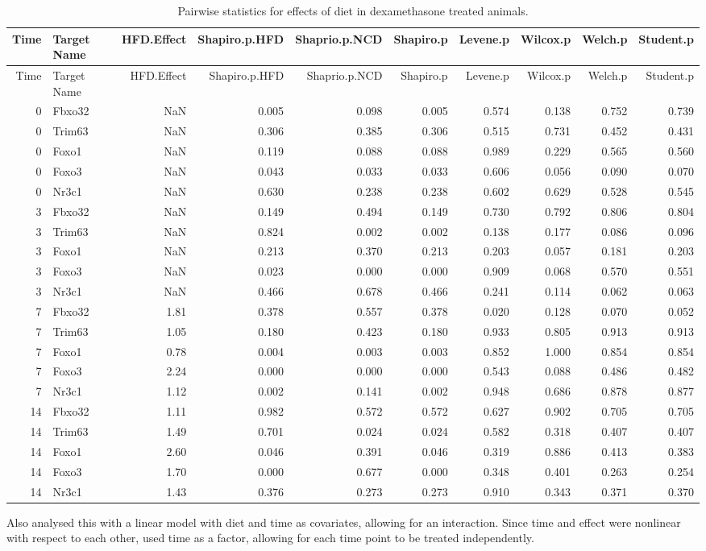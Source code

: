 \documentclass[]{article}
\begin{document}
\begin{longtable}[]{@{}rlrrrrrrrr@{}}
\caption{Pairwise statistics for effects of diet in dexamethasone
treated animals.}\tabularnewline
\toprule
Time & Target Name & HFD.Effect & Shapiro.p.HFD & Shaprio.p.NCD &
Shapiro.p & Levene.p & Wilcox.p & Welch.p & Student.p\tabularnewline
\midrule
\endfirsthead
\toprule
Time & Target Name & HFD.Effect & Shapiro.p.HFD & Shaprio.p.NCD &
Shapiro.p & Levene.p & Wilcox.p & Welch.p & Student.p\tabularnewline
\midrule
\endhead
0 & Fbxo32 & NaN & 0.005 & 0.098 & 0.005 & 0.574 & 0.138 & 0.752 &
0.739\tabularnewline
0 & Trim63 & NaN & 0.306 & 0.385 & 0.306 & 0.515 & 0.731 & 0.452 &
0.431\tabularnewline
0 & Foxo1 & NaN & 0.119 & 0.088 & 0.088 & 0.989 & 0.229 & 0.565 &
0.560\tabularnewline
0 & Foxo3 & NaN & 0.043 & 0.033 & 0.033 & 0.606 & 0.056 & 0.090 &
0.070\tabularnewline
0 & Nr3c1 & NaN & 0.630 & 0.238 & 0.238 & 0.602 & 0.629 & 0.528 &
0.545\tabularnewline
3 & Fbxo32 & NaN & 0.149 & 0.494 & 0.149 & 0.730 & 0.792 & 0.806 &
0.804\tabularnewline
3 & Trim63 & NaN & 0.824 & 0.002 & 0.002 & 0.138 & 0.177 & 0.086 &
0.096\tabularnewline
3 & Foxo1 & NaN & 0.213 & 0.370 & 0.213 & 0.203 & 0.057 & 0.181 &
0.203\tabularnewline
3 & Foxo3 & NaN & 0.023 & 0.000 & 0.000 & 0.909 & 0.068 & 0.570 &
0.551\tabularnewline
3 & Nr3c1 & NaN & 0.466 & 0.678 & 0.466 & 0.241 & 0.114 & 0.062 &
0.063\tabularnewline
7 & Fbxo32 & 1.81 & 0.378 & 0.557 & 0.378 & 0.020 & 0.128 & 0.070 &
0.052\tabularnewline
7 & Trim63 & 1.05 & 0.180 & 0.423 & 0.180 & 0.933 & 0.805 & 0.913 &
0.913\tabularnewline
7 & Foxo1 & 0.78 & 0.004 & 0.003 & 0.003 & 0.852 & 1.000 & 0.854 &
0.854\tabularnewline
7 & Foxo3 & 2.24 & 0.000 & 0.000 & 0.000 & 0.543 & 0.088 & 0.486 &
0.482\tabularnewline
7 & Nr3c1 & 1.12 & 0.002 & 0.141 & 0.002 & 0.948 & 0.686 & 0.878 &
0.877\tabularnewline
14 & Fbxo32 & 1.11 & 0.982 & 0.572 & 0.572 & 0.627 & 0.902 & 0.705 &
0.705\tabularnewline
14 & Trim63 & 1.49 & 0.701 & 0.024 & 0.024 & 0.582 & 0.318 & 0.407 &
0.407\tabularnewline
14 & Foxo1 & 2.60 & 0.046 & 0.391 & 0.046 & 0.319 & 0.886 & 0.413 &
0.383\tabularnewline
14 & Foxo3 & 1.70 & 0.000 & 0.677 & 0.000 & 0.348 & 0.401 & 0.263 &
0.254\tabularnewline
14 & Nr3c1 & 1.43 & 0.376 & 0.273 & 0.273 & 0.910 & 0.343 & 0.371 &
0.370\tabularnewline
\bottomrule
\end{longtable}

Also analysed this with a linear model with diet and time as covariates,
allowing for an interaction. Since time and effect were nonlinear with
respect to each other, used time as a factor, allowing for each time
point to be treated independently.
\end{document}
